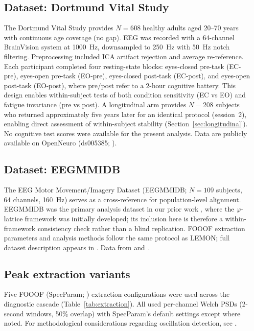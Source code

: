 \documentclass[11pt,a4paper]{article}
\newcommand{\phisym}{\varphi}
\begin{document}
\subsection{Dataset: Dortmund Vital Study}

The Dortmund Vital Study provides $N = 608$ healthy adults aged 20--70 years with continuous age coverage (no gap). EEG was recorded with a 64-channel BrainVision system at 1000~Hz, downsampled to 250~Hz with 50~Hz notch filtering. Preprocessing included ICA artifact rejection and average re-reference. Each participant completed four resting-state blocks: eyes-closed pre-task (EC-pre), eyes-open pre-task (EO-pre), eyes-closed post-task (EC-post), and eyes-open post-task (EO-post), where pre/post refer to a 2-hour cognitive battery. This design enables within-subject tests of both condition sensitivity (EC vs EO) and fatigue invariance (pre vs post). A longitudinal arm provides $N = 208$ subjects who returned approximately five years later for an identical protocol (session~2), enabling direct assessment of within-subject stability (Section~\ref{sec:longitudinal}). No cognitive test scores were available for the present analysis. Data are publicly available on OpenNeuro (ds005385; \cite{GudiMindermann2024}).

\subsection{Dataset: EEGMMIDB}

The EEG Motor Movement/Imagery Dataset (EEGMMIDB; $N = 109$ subjects, 64 channels, 160~Hz) serves as a cross-reference for population-level alignment. EEGMMIDB was the primary analysis dataset in our prior work \parencite{Lacy2026paper2}, where the $\phisym$-lattice framework was initially developed; its inclusion here is therefore a within-framework consistency check rather than a blind replication. FOOOF extraction parameters and analysis methods follow the same protocol as LEMON; full dataset description appears in \textcite{Lacy2026paper2}. Data from \textcite{Schalk2004} and \textcite{Goldberger2000}.

\subsection{Peak extraction variants}

Five FOOOF (SpecParam; \cite{Donoghue2020}) extraction configurations were used across the diagnostic cascade (Table~\ref{tab:extraction}). All used per-channel Welch PSDs \parencite{Welch1967} (2-second windows, 50\% overlap) with SpecParam's default settings except where noted. For methodological considerations regarding oscillation detection, see \textcite{Donoghue2022methods}.
\end{document}
